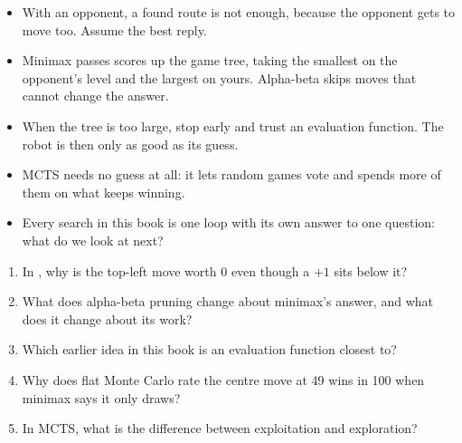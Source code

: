 \begin{chapterrecap}
\begin{itemize}
  \item With an opponent, a found route is not enough, because the opponent gets to move too. Assume the best reply.
  \item Minimax passes scores up the game tree, taking the smallest on the opponent's level and the largest on yours. Alpha-beta skips moves that cannot change the answer.
  \item When the tree is too large, stop early and trust an evaluation function. The robot is then only as good as its guess.
  \item MCTS needs no guess at all: it lets random games vote and spends more of them on what keeps winning.
  \item Every search in this book is one loop with its own answer to one question: what do we look at next?
\end{itemize}
\end{chapterrecap}

\begin{quickcheck}
\begin{enumerate}
  \item In , why is the top-left move worth 0 even though a $+1$ sits below it?
  \item What does alpha-beta pruning change about minimax's answer, and what does it change about its work?
  \item Which earlier idea in this book is an evaluation function closest to?
  \item Why does flat Monte Carlo rate the centre move at 49 wins in 100 when minimax says it only draws?
  \item In MCTS, what is the difference between exploitation and exploration?
\end{enumerate}
\end{quickcheck}
